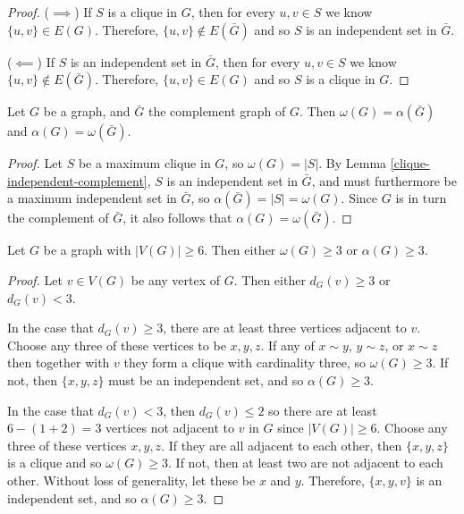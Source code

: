 \begin{proof}\proofbreak
    ($\implies$) If $S$ is a clique in $G$, then for every $u, v \in S$ we know $\{u, v\} \in E(G)$. Therefore, $\{u, v\} \notin E(\bar{G})$ and so $S$ is an independent set in $\bar{G}$.

    ($\impliedby$) If $S$ is an independent set in $\bar{G}$, then for every $u, v \in S$ we know $\{u, v\} \notin E(\bar{G})$. Therefore, $\{u, v\} \in E(G)$ and so $S$ is a clique in $G$.
\end{proof}

\begin{thm}
    Let $G$ be a graph, and $\bar{G}$ the complement graph of $G$. Then $\omega(G) = \alpha(\bar{G})$ and $\alpha(G) = \omega(\bar{G})$.
\end{thm}

\begin{proof}
    Let $S$ be a maximum clique in $G$, so $\omega(G) = |S|$. By Lemma \ref{clique-independent-complement}, $S$ is an independent set in $\bar{G}$, and must furthermore be a maximum independent set in $\bar{G}$, so $\alpha(\bar{G}) = |S| = \omega(G)$. Since $G$ is in turn the complement of $\bar{G}$, it also follows that $\alpha(G) = \omega(\bar{G})$.
\end{proof}

\begin{thm}
    Let $G$ be a graph with $|V(G)| \geq 6$. Then either $\omega(G) \geq 3$ or $\alpha(G) \geq 3$.
\end{thm}

\begin{proof}
    Let $v \in V(G)$ be any vertex of $G$. Then either $d_G(v) \geq 3$ or $d_G(v) < 3$.

    In the case that $d_G(v) \geq 3$, there are at least three vertices adjacent to $v$. Choose any three of these vertices to be $x, y, z$. If any of $x \sim y$, $y \sim z$, or $x \sim z$ then together with $v$ they form a clique with cardinality three, so $\omega(G) \geq 3$. If not, then $\{x, y, z\}$ must be an independent set, and so $\alpha(G) \geq 3$.

    In the case that $d_G(v) < 3$, then $d_G(v) \leq 2$ so there are at least $6 - (1 + 2) = 3$ vertices not adjacent to $v$ in $G$ since $|V(G)| \geq 6$. Choose any three of these vertices $x, y, z$. If they are all adjacent to each other, then $\{x, y, z\}$ is a clique and so $\omega(G) \geq 3$. If not, then at least two are not adjacent to each other. Without loss of generality, let these be $x$ and $y$. Therefore, $\{x, y, v\}$ is an independent set, and so $\alpha(G) \geq 3$.
\end{proof}

